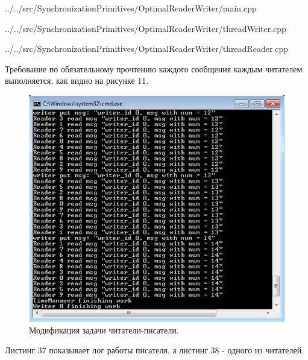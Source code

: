 \documentclass[a4paper, 12pt]{article}		%
\begin{document}

{../../src/SynchronizationPrimitives/OptimalReaderWriter/main.cpp}
\newpage


{../../src/SynchronizationPrimitives/OptimalReaderWriter/threadWriter.cpp}
\newpage


{../../src/SynchronizationPrimitives/OptimalReaderWriter/threadReader.cpp}
\newpage

Требование по обязательному прочтению каждого сообщения каждым читателем выполняется, как видно на рисунке 11.

\begin{figure}[h!]
\centering
\includegraphics[scale=0.9]{res/011}
\caption{Модификация задачи читатели-писатели.}
\end{figure}

Листинг 37 показывает лог работы писателя, а листинг 38 - одного из читателей.




\end{document}
